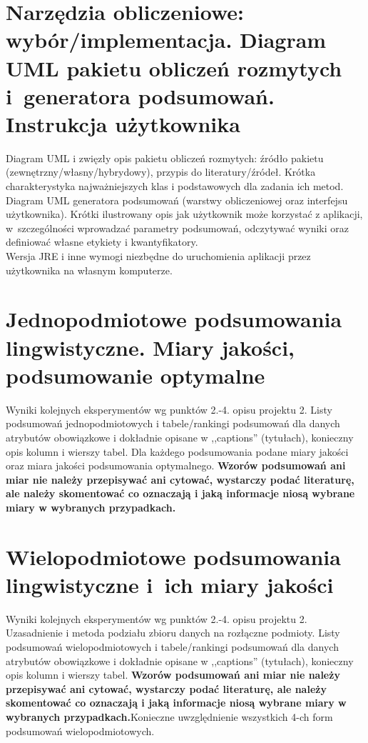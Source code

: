\documentclass{classrep}
\begin{document}

\section{Narzędzia obliczeniowe: wybór/implementacja. Diagram UML pakietu
obliczeń rozmytych i~generatora podsumowań. Instrukcja użytkownika}

Diagram UML i zwięzły opis pakietu obliczeń rozmytych: źródło pakietu
(zewnętrzny/własny/hybrydowy), przypis do literatury/źródeł. Krótka charakterystyka
najważniejszych klas i podstawowych dla zadania ich metod. \\

Diagram UML generatora podsumowań (warstwy obliczeniowej oraz interfejsu
użytkownika). Krótki ilustrowany opis jak użytkownik może korzystać z aplikacji, w~szczególności
wprowadzać parametry  podsumowań, odczytywać wyniki oraz definiować własne etykiety i
kwantyfikatory.\\

Wersja JRE i inne wymogi niezbędne do uruchomienia aplikacji przez użytkownika na własnym komputerze. 

\section{ Jednopodmiotowe podsumowania lingwistyczne. Miary jakości, podsumowanie optymalne}
Wyniki kolejnych eksperymentów wg punktów 2.-4. opisu projektu 2.  Listy podsumowań
jednopodmiotowych i tabele/rankingi podsumowań dla danych atrybutów obowiązkowe i dokładnie opisane w ,,captions'' (tytułach), konieczny opis kolumn i wierszy tabel. Dla każdego podsumowania podane miary jakości oraz miara jakości podsumowania
optymalnego. {\bf Wzorów podsumowań ani miar nie należy przepisywać ani cytować, wystarczy podać literaturę, ale
należy skomentować co oznaczają i jaką informacje niosą wybrane miary w wybranych
przypadkach.}\\

\section{Wielopodmiotowe podsumowania lingwistyczne i~ich miary jakości} 
Wyniki kolejnych eksperymentów wg punktów 2.-4. opisu projektu 2. Uzasadnienie i
metoda podziału zbioru danych na rozłączne podmioty. Listy podsumowań
wielopodmiotowych i tabele/rankingi podsumowań dla danych atrybutów obowiązkowe i
dokładnie opisane w ,,captions'' (tytułach), konieczny opis kolumn i wierszy tabel.
{\bf Wzorów podsumowań ani miar nie należy przepisywać ani cytować, wystarczy podać literaturę, ale
należy skomentować co oznaczają i jaką informacje niosą wybrane miary w wybranych
przypadkach.}Konieczne uwzględnienie wszystkich 4-ch form podsumowań wielopodmiotowych. 
\\ 
\end{document}
